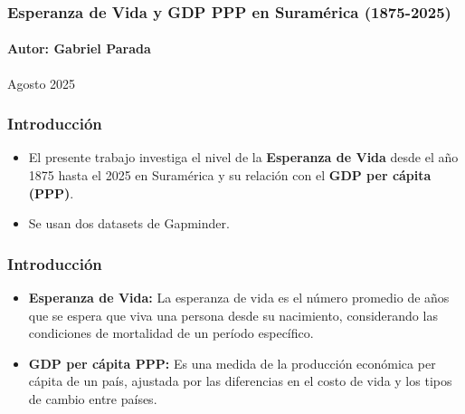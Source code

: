 \documentclass{beamer}
\begin{document}



\begin{frame}
\frametitle{Esperanza de Vida y GDP PPP en Suramérica (1875-2025)}
\framesubtitle{Autor: Gabriel Parada}
Agosto 2025

\end{frame}


\begin{frame}
\frametitle{Introducción}

\begin{itemize}
\item<1-> El presente trabajo investiga el nivel de la \textbf{Esperanza de Vida} desde el año 1875 hasta el 2025 en Suramérica y su relación con el \textbf{GDP per cápita (PPP)}. 
\item<2-> Se usan dos datasets de Gapminder.
\end{itemize}

\end{frame}

\begin{frame}
\frametitle{Introducción}

\begin{itemize}
\item<1> \textbf{Esperanza de Vida:} La esperanza de vida es el número promedio de años que se espera que viva una persona desde su nacimiento, considerando las condiciones de mortalidad de un período específico.

\item<2> \textbf{GDP per cápita PPP:} Es una medida de la producción económica per cápita de un país, ajustada por las diferencias en el costo de vida y los tipos de cambio entre países.	
\end{itemize}


\end{frame}
\end{document}
